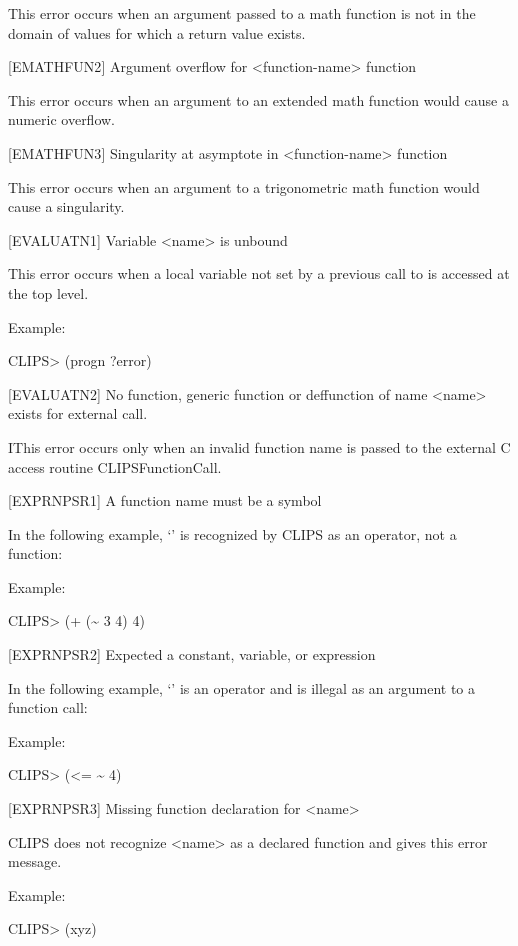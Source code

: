 \documentclass[letterpaper,10pt,english]{sphinxmanual}
\begin{document}
This error occurs when an argument passed to a math function is not in
the domain of values for which a return value exists.

{[}EMATHFUN2{]} Argument overflow for \textless{}function-name\textgreater{} function

This error occurs when an argument to an extended math function would
cause a numeric overflow.

{[}EMATHFUN3{]} Singularity at asymptote in \textless{}function-name\textgreater{} function

This error occurs when an argument to a trigonometric math function
would cause a singularity.

{[}EVALUATN1{]} Variable \textless{}name\textgreater{} is unbound

This error occurs when a local variable not set by a previous call to
 is accessed at the top level.

Example:

CLIPS\textgreater{} (progn ?error)

{[}EVALUATN2{]} No function, generic function or deffunction of name \textless{}name\textgreater{}
exists for external call.

IThis error occurs only when an invalid function name is passed to the
external C access routine CLIPSFunctionCall.

{[}EXPRNPSR1{]} A function name must be a symbol

In the following example, ‘\sphinxstylestrong{\textasciitilde{}}’ is recognized by CLIPS as an operator,
not a function:

Example:

CLIPS\textgreater{} (+ (\textasciitilde{} 3 4) 4)

{[}EXPRNPSR2{]} Expected a constant, variable, or expression

In the following example, ‘\sphinxstylestrong{\textasciitilde{}}’ is an operator and is illegal as an
argument to a function call:

Example:

CLIPS\textgreater{} (\textless{}= \textasciitilde{} 4)

{[}EXPRNPSR3{]} Missing function declaration for \textless{}name\textgreater{}

CLIPS does not recognize \textless{}name\textgreater{} as a declared function and gives this
error message.

Example:

CLIPS\textgreater{} (xyz)
\end{document}
